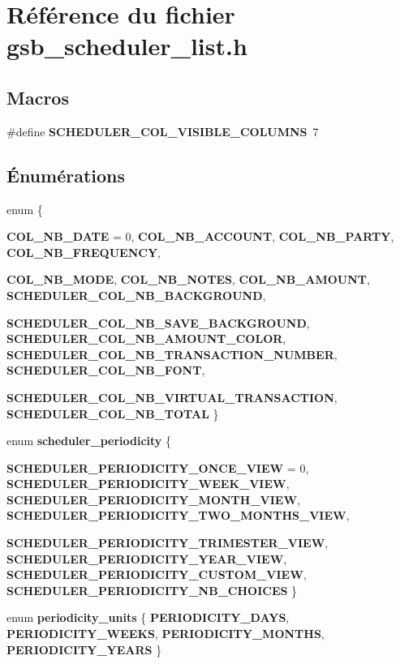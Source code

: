 \section{Référence du fichier gsb\_\-scheduler\_\-list.h}
\label{gsb__scheduler__list_8h}
\subsection*{Macros}
\begin{DoxyCompactItemize}
\item 
\#define {\bf SCHEDULER\_\-COL\_\-VISIBLE\_\-COLUMNS}~7
\end{DoxyCompactItemize}
\subsection*{Énumérations}
\begin{DoxyCompactItemize}
\item 
enum \{ \par
{\bf COL\_\-NB\_\-DATE} =  0, 
{\bf COL\_\-NB\_\-ACCOUNT}, 
{\bf COL\_\-NB\_\-PARTY}, 
{\bf COL\_\-NB\_\-FREQUENCY}, 
\par
{\bf COL\_\-NB\_\-MODE}, 
{\bf COL\_\-NB\_\-NOTES}, 
{\bf COL\_\-NB\_\-AMOUNT}, 
{\bf SCHEDULER\_\-COL\_\-NB\_\-BACKGROUND}, 
\par
{\bf SCHEDULER\_\-COL\_\-NB\_\-SAVE\_\-BACKGROUND}, 
{\bf SCHEDULER\_\-COL\_\-NB\_\-AMOUNT\_\-COLOR}, 
{\bf SCHEDULER\_\-COL\_\-NB\_\-TRANSACTION\_\-NUMBER}, 
{\bf SCHEDULER\_\-COL\_\-NB\_\-FONT}, 
\par
{\bf SCHEDULER\_\-COL\_\-NB\_\-VIRTUAL\_\-TRANSACTION}, 
{\bf SCHEDULER\_\-COL\_\-NB\_\-TOTAL}
 \}
\item 
enum {\bf scheduler\_\-periodicity} \{ \par
{\bf SCHEDULER\_\-PERIODICITY\_\-ONCE\_\-VIEW} =  0, 
{\bf SCHEDULER\_\-PERIODICITY\_\-WEEK\_\-VIEW}, 
{\bf SCHEDULER\_\-PERIODICITY\_\-MONTH\_\-VIEW}, 
{\bf SCHEDULER\_\-PERIODICITY\_\-TWO\_\-MONTHS\_\-VIEW}, 
\par
{\bf SCHEDULER\_\-PERIODICITY\_\-TRIMESTER\_\-VIEW}, 
{\bf SCHEDULER\_\-PERIODICITY\_\-YEAR\_\-VIEW}, 
{\bf SCHEDULER\_\-PERIODICITY\_\-CUSTOM\_\-VIEW}, 
{\bf SCHEDULER\_\-PERIODICITY\_\-NB\_\-CHOICES}
 \}
\item 
enum {\bf periodicity\_\-units} \{ {\bf PERIODICITY\_\-DAYS}, 
{\bf PERIODICITY\_\-WEEKS}, 
{\bf PERIODICITY\_\-MONTHS}, 
{\bf PERIODICITY\_\-YEARS}
 \}
\end{DoxyCompactItemize}
